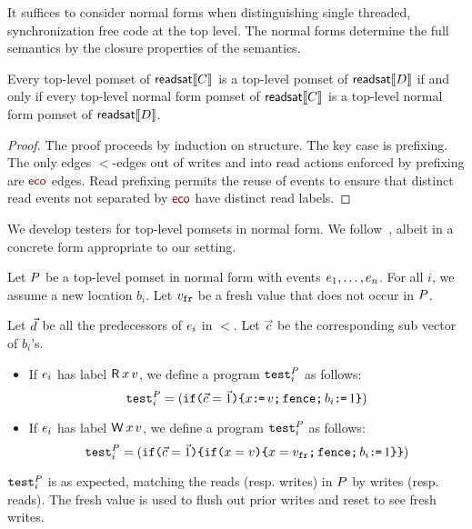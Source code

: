 It suffices to consider normal forms when distinguishing single threaded, synchronization free code at the top level.  The normal forms determine the full semantics by the closure properties of the semantics.

\begin{lemma}\label{unrhd}
Every top-level pomset of $\mathsf{readsat}\llbracket C\rrbracket$ is a top-level pomset of $\mathsf{readsat}\llbracket D\rrbracket$ if and only if 
every top-level normal form pomset of $\mathsf{readsat}\llbracket C\rrbracket$ is a top-level normal form pomset of $\mathsf{readsat}\llbracket D\rrbracket$.
\begin{proof}
The proof proceeds by induction on structure.  The key case is prefixing.  The only edges $\lt$-edges out of writes  and into read actions enforced by prefixing are $\reco$ edges.  Read prefixing permits the reuse of events to ensure that distinct read events not separated by $\reco$ have distinct read labels.  
\end{proof}
\end{lemma}

We develop testers for top-level pomsets in normal form.  We  follow~\citet{Plotkin:1997:TSP:266557.266600}, albeit in a concrete form appropriate to our setting.   

Let $P$ be a top-level pomset in normal form with events $e_1, \ldots,
e_n$.  For all $i$, we assume a new location $b_i$.    Let $v_{{\tt fr}}$ be a fresh value that does not occur in $P$.  

Let $\vec{d}$ be all  the predecessors of $e_i$ in $\lt$. Let $\vec{c}$ be the corresponding sub vector of $b_i$'s. 
\begin{itemize}
\item 
If $e_i$ has label $\DR{\aLoc}{\aVal}$, we define a program ${\tt test}^{P}_{i}$ as follows:  
\[
  {\tt test}^{P}_{i} = (
  \texttt{if}\allowbreak\texttt{(}\vec{c}=\vec{1}\texttt{)} \allowbreak\texttt{\{} x \texttt{:}\mkern-1mu\texttt{=}\, v \texttt{;}\,\allowbreak  \texttt{fence} \texttt{;}\,\allowbreak b_i \texttt{:}\mkern-1mu\texttt{=}\, 1 \texttt{\}})
\]
\item 
If $e_i$ has label $\DW{\aLoc}{\aVal}$, we define a program ${\tt test}^{P}_{i}$ as follows:
\[
  \testP{\aPS}{i} = (
  \IF{\vec{c}=\vec{1}} \THEN %
  \IF{\aLoc = \aVal} \THEN \aLoc = \freshaval \SEMI \FENCE \SEMI b_i \GETS 1  \FI \FI)
\]
\end{itemize}
${\tt test}^{P}_{i}$ is as expected, matching the reads (resp. writes) in $P$ by writes (resp. reads).  The fresh value is used to flush out prior writes and reset to see fresh writes.    

